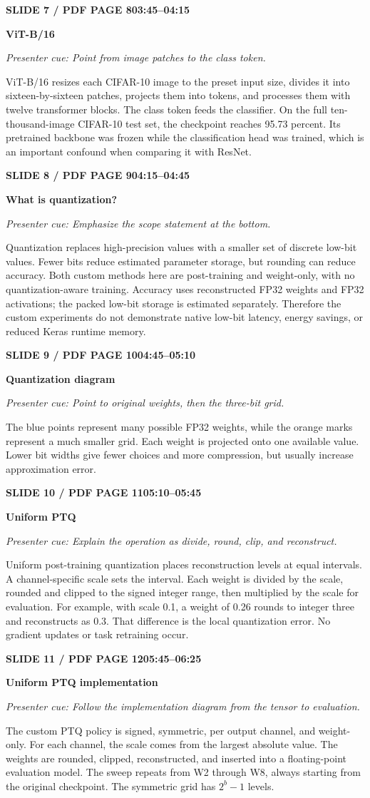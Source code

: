 \documentclass[11pt,a4paper]{article}
\newcommand{\slidetitle}[3]{%
  \vspace{2mm}\noindent
  \colorbox{TUblue}{\parbox{\dimexpr\textwidth-2\fboxsep}{\color{white}\bfseries #1\hfill #2}}%
  \par\textcolor{TUorange}{\bfseries #3}\par
}
\newcommand{\cue}[1]{\textit{\textcolor{TUblue}{Presenter cue: #1}}\par}
\newcommand{\spoken}[1]{#1\par}
\begin{document}
\slidetitle{SLIDE 7 / PDF PAGE 8}{03:45--04:15}{ViT-B/16}
\cue{Point from image patches to the class token.}
\spoken{ViT-B/16 resizes each CIFAR-10 image to the preset input size, divides it into sixteen-by-sixteen patches, projects them into tokens, and processes them with twelve transformer blocks. The class token feeds the classifier. On the full ten-thousand-image CIFAR-10 test set, the checkpoint reaches 95.73 percent. Its pretrained backbone was frozen while the classification head was trained, which is an important confound when comparing it with ResNet.}

\slidetitle{SLIDE 8 / PDF PAGE 9}{04:15--04:45}{What is quantization?}
\cue{Emphasize the scope statement at the bottom.}
\spoken{Quantization replaces high-precision values with a smaller set of discrete low-bit values. Fewer bits reduce estimated parameter storage, but rounding can reduce accuracy. Both custom methods here are post-training and weight-only, with no quantization-aware training. Accuracy uses reconstructed FP32 weights and FP32 activations; the packed low-bit storage is estimated separately. Therefore the custom experiments do not demonstrate native low-bit latency, energy savings, or reduced Keras runtime memory.}

\slidetitle{SLIDE 9 / PDF PAGE 10}{04:45--05:10}{Quantization diagram}
\cue{Point to original weights, then the three-bit grid.}
\spoken{The blue points represent many possible FP32 weights, while the orange marks represent a much smaller grid. Each weight is projected onto one available value. Lower bit widths give fewer choices and more compression, but usually increase approximation error.}

\slidetitle{SLIDE 10 / PDF PAGE 11}{05:10--05:45}{Uniform PTQ}
\cue{Explain the operation as divide, round, clip, and reconstruct.}
\spoken{Uniform post-training quantization places reconstruction levels at equal intervals. A channel-specific scale sets the interval. Each weight is divided by the scale, rounded and clipped to the signed integer range, then multiplied by the scale for evaluation. For example, with scale 0.1, a weight of 0.26 rounds to integer three and reconstructs as 0.3. That difference is the local quantization error. No gradient updates or task retraining occur.}

\slidetitle{SLIDE 11 / PDF PAGE 12}{05:45--06:25}{Uniform PTQ implementation}
\cue{Follow the implementation diagram from the tensor to evaluation.}
\spoken{The custom PTQ policy is signed, symmetric, per output channel, and weight-only. For each channel, the scale comes from the largest absolute value. The weights are rounded, clipped, reconstructed, and inserted into a floating-point evaluation model. The sweep repeats from W2 through W8, always starting from the original checkpoint. The symmetric grid has $2^b-1$ levels.}
\end{document}
